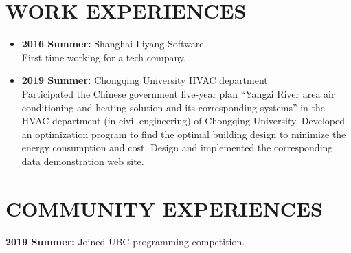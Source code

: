 \documentclass{res}
\begin{document}
\begin{resume}
\section{WORK EXPERIENCES}
\begin{itemize}[leftmargin=-.2in]
    \setlength\itemsep{-1em}

    \item \textbf{2016 Summer:} Shanghai Liyang Software
    \vspace{0.05in}\\
    First time working for a tech company. \\
    \item \textbf{2019 Summer:} Chongqing University HVAC department
    \vspace{0.05in}\\
    Participated the Chinese government five-year plan ``Yangzi River area air conditioning and heating solution and its corresponding systems'' in the HVAC department (in civil engineering) of Chongqing University. Developed an optimization program to find the optimal building design to minimize the energy consumption and cost. Design and implemented the corresponding data demonstration web site.
\end{itemize}


\section{COMMUNITY EXPERIENCES}
    \textbf {2019 Summer:} Joined UBC programming competition.
\end{resume}
\end{document}

